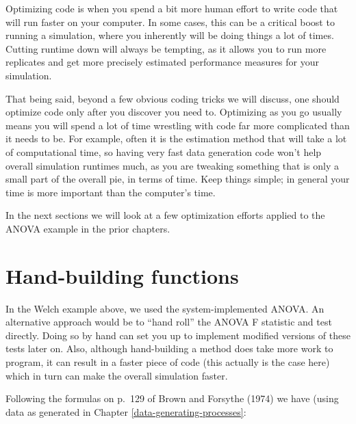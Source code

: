 \documentclass[
]{book}
\begin{document}
Optimizing code is when you spend a bit more human effort to write code that will run faster on your computer.
In some cases, this can be a critical boost to running a simulation, where you inherently will be doing things a lot of times.
Cutting runtime down will always be tempting, as it allows you to run more replicates and get more precisely estimated performance measures for your simulation.

That being said, beyond a few obvious coding tricks we will discuss, one should optimize code only after you discover you need to.
Optimizing as you go usually means you will spend a lot of time wrestling with code far more complicated than it needs to be.
For example, often it is the estimation method that will take a lot of computational time, so having very fast data generation code won't help overall simulation runtimes much, as you are tweaking something that is only a small part of the overall pie, in terms of time.
Keep things simple; in general your time is more important than the computer's time.

In the next sections we will look at a few optimization efforts applied to the ANOVA example in the prior chapters.

\section{Hand-building functions}\label{hand-building-functions}

In the Welch example above, we used the system-implemented ANOVA.
An alternative approach would be to ``hand roll'' the ANOVA F statistic and test directly.
Doing so by hand can set you up to implement modified versions of these tests later on.
Also, although hand-building a method does take more work to program, it can result in a faster piece of code (this actually is the case here) which in turn can make the overall simulation faster.

Following the formulas on p.~129 of Brown and Forsythe (1974) we have (using data as generated in Chapter \ref{data-generating-processes}:
\end{document}
